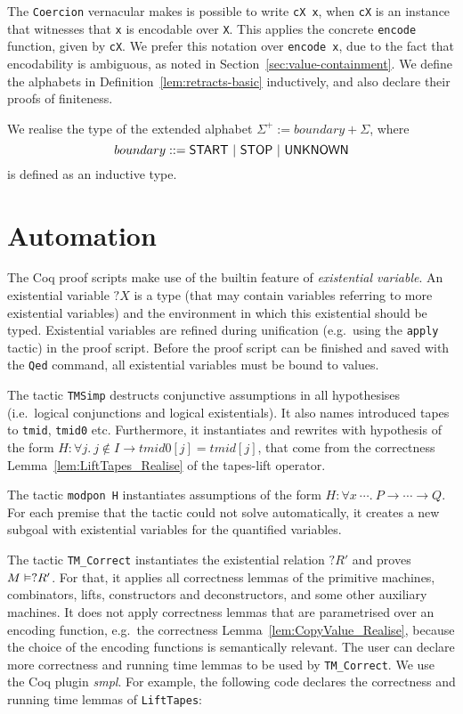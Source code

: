 The \lstinline!Coercion! vernacular makes is possible to write \lstinline!cX x!, when \lstinline!cX! is an instance that witnesses that \lstinline!x!
is encodable over \lstinline!X!.  This applies the concrete \lstinline!encode! function, given by \lstinline!cX!.  We prefer this notation over
\lstinline!encode x!, due to the fact that encodability is ambiguous, as noted in Section~\ref{sec:value-containment}.  We define the alphabets in
Definition~\ref{lem:retracts-basic} inductively, and also declare their proofs of finiteness.

We realise the type of the extended alphabet $\Sigma^+ := boundary + \Sigma$, where
\[ boundary ::= \mathsf{START} ~|~ \mathsf{STOP} ~|~ \mathsf{UNKNOWN} \]%
is defined as an inductive type.


\section*{Automation}
\label{sec:coq-automation}

The Coq proof scripts make use of the builtin feature of \textit{existential variable}.  An existential variable $?X$ is a type (that may contain
variables referring to more existential variables) and the environment in which this existential should be typed.  Existential variables are refined
during unification (e.g.\ using the \lstinline!apply! tactic) in the proof script.  Before the proof script can be finished and saved with the
\lstinline!Qed! command, all existential variables must be bound to values.

The tactic \lstinline!TMSimp! destructs conjunctive assumptions in all hypothesises (i.e.\ logical conjunctions and logical existentials).  It also
names introduced tapes to \lstinline!tmid!, \lstinline!tmid0! etc.  Furthermore, it instantiates and rewrites with hypothesis of the form
$H: \forall j.~ j \notin I \rightarrow tmid0[j] = tmid[j]$, that come from the correctness Lemma~\ref{lem:LiftTapes_Realise} of the tapes-lift
operator.

The tactic \lstinline!modpon H! instantiates assumptions of the form $H: \forall x~\cdots.~P \rightarrow \cdots \rightarrow Q$.  For each premise that
the tactic could not solve automatically, it creates a new subgoal with existential variables for the quantified variables.

The tactic \lstinline!TM_Correct! instantiates the existential relation $?R'$ and proves $M \mathrel{\vDash} ?R'$.  For that, it applies all correctness
lemmas of the primitive machines, combinators, lifts, constructors and deconstructors, and some other auxiliary machines.  It does not apply
correctness lemmas that are parametrised over an encoding function, e.g.\ the correctness Lemma~\ref{lem:CopyValue_Realise}, because the choice of the
encoding functions is semantically relevant.  The user can declare more correctness and running time lemmas to be used by \lstinline!TM_Correct!.  We
use the Coq plugin \textit{smpl}.  For example, the following code declares the correctness and running time lemmas of \lstinline!LiftTapes!:

